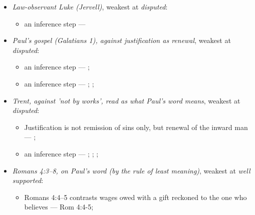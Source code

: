 \documentclass[11pt]{article}
\begin{document}
\begin{itemize}
\begin{itemize}
\item Second Temple Judaism also held final vindication according to works (encoded as a denial, so it ranks disputed) --- \cite{gathercole-where-boasting-2002}; \cite{carson-variegated-nomism-1-2001}
\item an inference step --- \cite{gathercole-where-boasting-2002}; \cite{carson-variegated-nomism-1-2001}
\end{itemize}
\item \emph{Law-observant Luke (Jervell)}, weakest at \emph{disputed}:
\begin{itemize}
\item an inference step --- \cite{jervell-luke-people-god-1972}
\end{itemize}
\item \emph{Paul's gospel (Galatians 1), against justification as renewal}, weakest at \emph{disputed}:
\begin{itemize}
\item an inference step --- \cite[ad loc. Gal 1:6]{moo-galatians-2013}; \cite[XI.1]{westminster-confession-1647}
\item an inference step --- \cite[XI.1]{westminster-confession-1647}; \cite[III.xi.2]{calvin-institutes-1960}; \cite{morris-apostolic-preaching-1965}
\end{itemize}
\item \emph{Trent, against 'not by works', read as what Paul's word means}, weakest at \emph{disputed}:
\begin{itemize}
\item Justification is not remission of sins only, but renewal of the inward man --- \cite[Trent, Session VI (1547), Decree on Justification, ch. 7]{tanner-decrees-1990}; \cite[Trent, Session VI (1547), canon 11]{tanner-decrees-1990}
\item an inference step --- \cite[Trent, Session VI (1547), Decree on Justification, ch. 8]{tanner-decrees-1990}; \cite[Trent, Session VI (1547), Decree on Justification, ch. 7]{tanner-decrees-1990}; \cite[On the Spirit and the Letter, ch. 45 (26.45)]{npnf1-05-1887}; \cite{mcgrath-iustitia-dei-2005}
\end{itemize}
\item \emph{Romans 4:3–8, on Paul's word (by the rule of least meaning)}, weakest at \emph{well supported}:
\begin{itemize}
\item Romans 4:4–5 contrasts wages owed with a gift reckoned to the one who believes --- Rom 4:4-5; \cite[III.xi.18]{calvin-institutes-1960}

\end{itemize}
\end{itemize}
\end{document}
